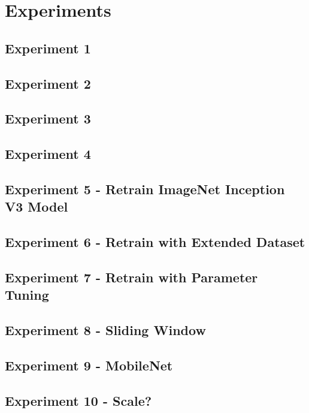 \chapter{Experiments}
\label{exp}

\section{Experiment 1}


\section{Experiment 2}


\section{Experiment 3}


\section{Experiment 4}


\section{Experiment 5 - Retrain ImageNet Inception V3 Model}


\section{Experiment 6 - Retrain with Extended Dataset}


\section{Experiment 7 - Retrain with Parameter Tuning}


\section{Experiment 8 - Sliding Window}


\section{Experiment 9 - MobileNet}


\section{Experiment 10 - Scale?}

